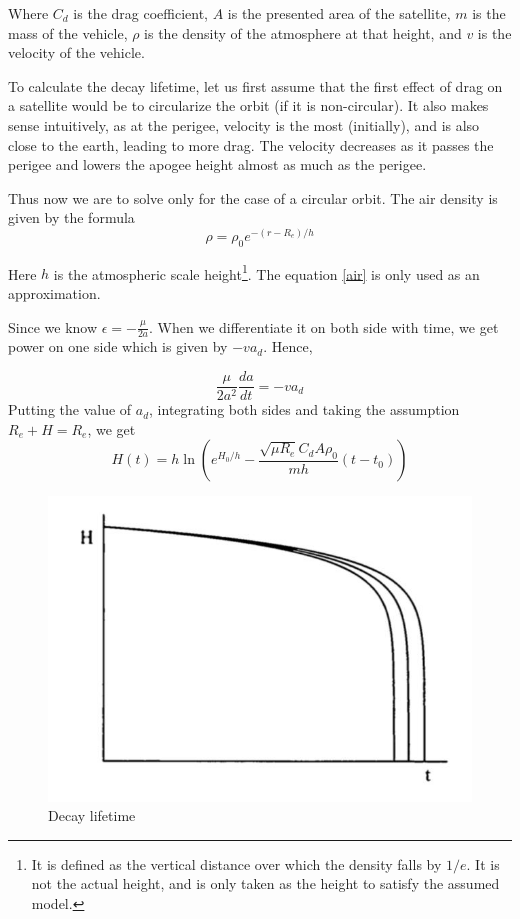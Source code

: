 \documentclass{article}
\theoremstyle{definition}
\begin{document}
Where $C_d$ is the drag coefficient, $A$ is the presented area of the satellite, $m$ is the mass of the vehicle, $\rho$ is the density of the atmosphere at that height, and $v$ is the velocity of the vehicle.

To calculate the decay lifetime, let us first assume that the first effect of drag on a satellite would be to circularize the orbit (if it is non-circular).
It also makes sense intuitively, as at the perigee, velocity is the most (initially), and is also close to the earth, leading to more drag.
The velocity decreases as it passes the perigee and lowers the apogee height almost as much as the perigee.

Thus now we are to solve only for the case of a circular orbit.
The air density is given by the formula
\begin{equation}\label{air}
    \rho = \rho_0e^{-(r-R_e)/h}
\end{equation}

Here $h$ is the atmospheric scale height\footnote{It is defined as the vertical distance over which the density falls by $1/e$. It is not the actual height, and is only taken as the height to satisfy the assumed model.}.
The equation \ref{air} is only used as an approximation.

Since we know $\epsilon = -\frac{\mu}{2a}$. When we differentiate it on both side with time, we get power on one side which is given by $-va_d$.
Hence,

\begin{equation}
    \frac{\mu}{2a^2}\frac{da}{dt} = -va_d
\end{equation}
Putting the value of $a_d$, integrating both sides and taking the assumption $R_e + H = R_e$, we get
\begin{equation}\label{decay}
    H(t) = h\ln{\left(e^{H_0/h} - \frac{\sqrt{\mu R_e}C_dA\rho_0}{mh}(t-t_0)\right) }
\end{equation}

\begin{figure}[h]
    \centering
    \includegraphics[scale = 0.2]{image 8.jpeg}
    \caption{Decay lifetime}
    \label{fig:decay}
\end{figure}
\end{document}
